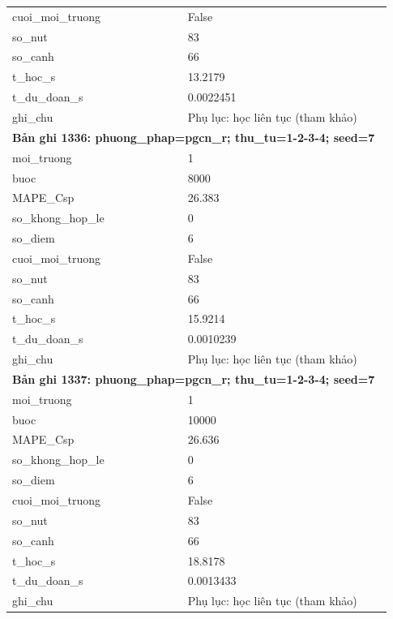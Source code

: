 \begin{longtable}{p{0.43\linewidth}p{0.50\linewidth}}
cuoi\_\allowbreak moi\_\allowbreak truong & False \\
so\_\allowbreak nut & 83 \\
so\_\allowbreak canh & 66 \\
t\_\allowbreak hoc\_\allowbreak s & 13.2179 \\
t\_\allowbreak du\_\allowbreak doan\_\allowbreak s & 0.0022451 \\
ghi\_\allowbreak chu & Phụ lục: học liên tục (tham khảo) \\
\midrule
\multicolumn{2}{p{0.95\linewidth}}{\textbf{Bản ghi 1336: phuong\_phap=pgcn\_r; thu\_tu=1-2-3-4; seed=7}} \\
moi\_\allowbreak truong & 1 \\
buoc & 8000 \\
MAPE\_\allowbreak Csp & 26.383 \\
so\_\allowbreak khong\_\allowbreak hop\_\allowbreak le & 0 \\
so\_\allowbreak diem & 6 \\
cuoi\_\allowbreak moi\_\allowbreak truong & False \\
so\_\allowbreak nut & 83 \\
so\_\allowbreak canh & 66 \\
t\_\allowbreak hoc\_\allowbreak s & 15.9214 \\
t\_\allowbreak du\_\allowbreak doan\_\allowbreak s & 0.0010239 \\
ghi\_\allowbreak chu & Phụ lục: học liên tục (tham khảo) \\
\midrule
\multicolumn{2}{p{0.95\linewidth}}{\textbf{Bản ghi 1337: phuong\_phap=pgcn\_r; thu\_tu=1-2-3-4; seed=7}} \\
moi\_\allowbreak truong & 1 \\
buoc & 10000 \\
MAPE\_\allowbreak Csp & 26.636 \\
so\_\allowbreak khong\_\allowbreak hop\_\allowbreak le & 0 \\
so\_\allowbreak diem & 6 \\
cuoi\_\allowbreak moi\_\allowbreak truong & False \\
so\_\allowbreak nut & 83 \\
so\_\allowbreak canh & 66 \\
t\_\allowbreak hoc\_\allowbreak s & 18.8178 \\
t\_\allowbreak du\_\allowbreak doan\_\allowbreak s & 0.0013433 \\
ghi\_\allowbreak chu & Phụ lục: học liên tục (tham khảo) \\

\end{longtable}
